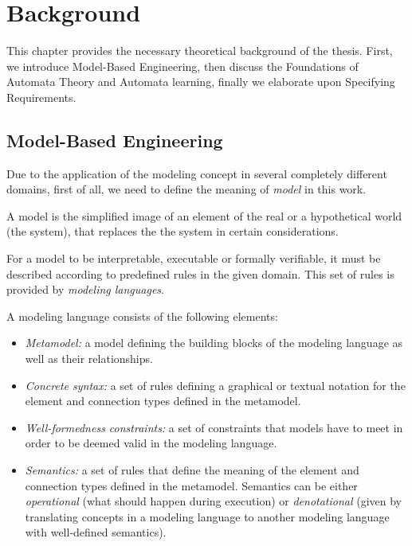 \chapter{Background} \label{background}
This chapter provides the necessary theoretical background of the thesis. First, we introduce Model-Based Engineering, then discuss the Foundations of Automata Theory and Automata learning, finally we elaborate upon Specifying Requirements.
\section{Model-Based Engineering} \label{sec_backgrmbe}
Due to the application of the modeling concept in several completely different domains, first of all, we need to define the meaning of \textit{model} in this work.
\begin{definition}[Model]
	A model is the simplified image of an element of the real or a hypothetical world (the system), that replaces the the system in certain considerations.
\end{definition}

For a model to be interpretable, executable or formally verifiable, it must be described according to predefined rules in the given domain. This set of rules is provided by \textit{modeling languages}.
\begin{definition}
	A modeling language consists of the following elements:
	\begin{itemize}
		\item \emph{Metamodel:} a model defining the building blocks of the modeling language as well
		as their relationships.
		\item \emph{Concrete syntax:} a set of rules defining a graphical or textual notation for the
		element and connection types defined in the metamodel.
		\item \emph{Well-formedness constraints:} a set of constraints that models have to meet in order
		to be deemed valid in the modeling language.
		\item \emph{Semantics:} a set of rules that define the meaning of the element and connection
		types defined in the metamodel. Semantics can be either \textit{operational} (what should happen during execution) or \textit{denotational} (given by translating concepts in a modeling language to another modeling language with well-defined semantics).
	\end{itemize}
\end{definition}

